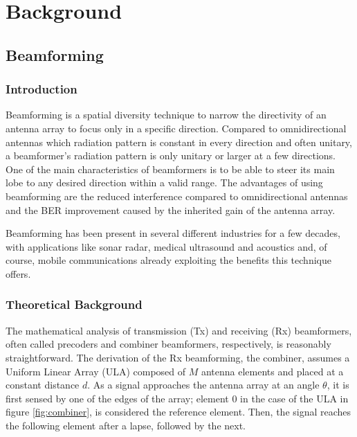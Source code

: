 \documentclass[12pt,a4paper]{report}
\begin{document}
\chapter{Background} \label{back}
\section{Beamforming} \label{back:bf}
\subsection{Introduction} \label{back:bf:intro}
Beamforming is a spatial diversity technique to narrow the directivity of an antenna array to focus only in a specific direction. Compared to omnidirectional antennas which radiation pattern is constant in every direction and often unitary, a beamformer's radiation pattern is only unitary or larger at a few directions. One of the main characteristics of beamformers is to be able to steer its main lobe to any desired direction within a valid range. The advantages of using beamforming are the reduced interference compared to omnidirectional antennas and the BER improvement caused by the inherited gain of the antenna array.

Beamforming has been present in several different industries for a few decades, with applications like sonar radar, medical ultrasound and acoustics and, of course, mobile communications already exploiting the benefits this technique offers.

\subsection{Theoretical Background} \label{back:bf:theoretical}
The mathematical analysis of transmission (Tx) and receiving (Rx) beamformers, often called precoders and combiner beamformers, respectively, is reasonably straightforward. The derivation of the Rx beamforming, the combiner, assumes a Uniform Linear Array (ULA) composed of $M$ antenna elements and placed at a constant distance $d$. As a signal approaches the antenna array at an angle $\theta$, it is first sensed by one of the edges of the array; element 0 in the case of the ULA in figure \ref{fig:combiner}, is considered the reference element. Then, the signal reaches the following element after a lapse, followed by the next. \cite{Allen2005, Liu2010}
\end{document}
